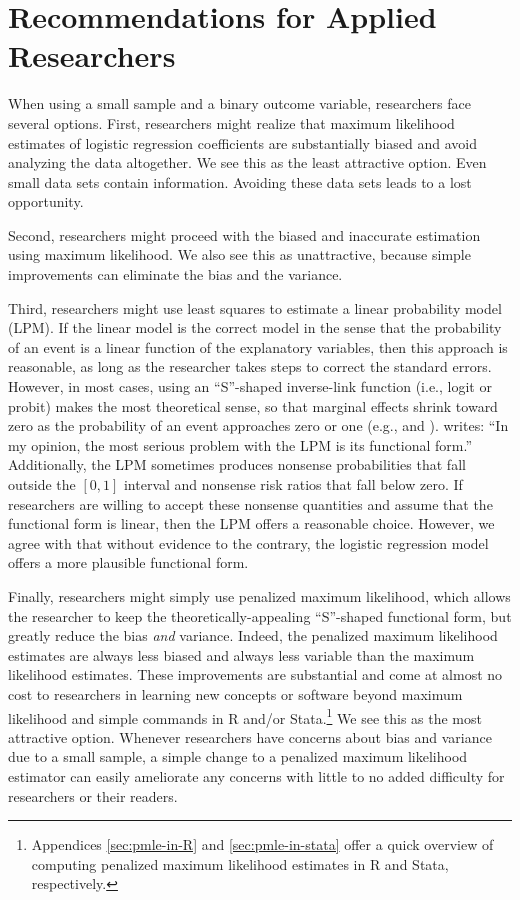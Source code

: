 \documentclass[12pt]{article}
\begin{document}
\section*{Recommendations for Applied Researchers}

When using a small sample and a binary outcome variable, researchers face several options. First, researchers might realize that maximum likelihood estimates of logistic regression coefficients are substantially biased and avoid analyzing the data altogether. 
We see this as the least attractive option. 
Even small data sets contain information.
Avoiding these data sets leads to a lost opportunity.

Second, researchers might proceed with the biased and inaccurate estimation using maximum likelihood. 
We also see this as unattractive, because simple improvements can eliminate the bias and the variance.

Third, researchers might use least squares to estimate a linear probability model (LPM). If the linear model is the correct model in the sense that the probability of an event is a linear function of the explanatory variables, then this approach is reasonable, as long as the researcher takes steps to correct the standard errors. 
However, in most cases, using an ``S''-shaped inverse-link function (i.e., logit or probit) makes the most theoretical sense, so that marginal effects shrink toward zero as the probability of an event approaches zero or one (e.g., 
\citealt{BerryDeMerittEsarey2010} and \citealt[pp. 34-47]{Long1997}). 
\citet[p. 40]{Long1997} writes: ``In my opinion, the most serious problem with the LPM is its functional form.'' 
Additionally, the LPM sometimes produces nonsense probabilities that fall outside the $[0, 1]$ interval and nonsense risk ratios that fall below zero.
If researchers are willing to accept these nonsense quantities and assume that the functional form is linear, then the LPM offers a reasonable choice. 
However, we agree with \cite{Long1997} that without evidence to the contrary, the logistic regression model offers a more plausible functional form.

Finally, researchers might simply use penalized maximum likelihood, which allows the researcher to keep the theoretically-appealing ``S''-shaped functional form, but greatly reduce the bias \textit{and} variance. 
Indeed, the penalized maximum likelihood estimates are always less biased and always less variable than the maximum likelihood estimates.
These improvements are substantial and come at almost no cost to researchers in learning new concepts or software beyond maximum likelihood and simple commands in R and/or Stata.\footnote{Appendices \ref{sec:pmle-in-R} and \ref{sec:pmle-in-stata} offer a quick overview of computing penalized maximum likelihood estimates in R and Stata, respectively.} 
We see this as the most attractive option. 
Whenever researchers have concerns about bias and variance due to a small sample, a simple change to a penalized maximum likelihood estimator can easily ameliorate any concerns with little to no added difficulty for researchers or their readers.
\end{document}
